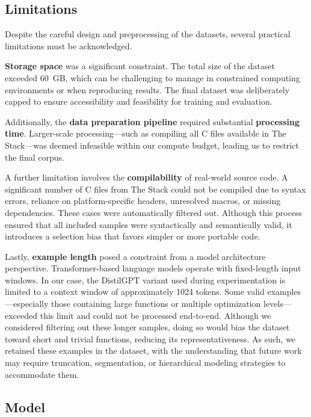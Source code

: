 \documentclass[../main.tex]{subfiles}
\begin{document}
\subsection{Limitations}

Despite the careful design and preprocessing of the datasets, several practical limitations must be acknowledged.

\textbf{Storage space} was a significant constraint. The total size of the dataset exceeded 60~GB, which can be challenging to manage in constrained computing environments or when reproducing results. The final dataset was deliberately capped to ensure accessibility and feasibility for training and evaluation.

Additionally, the \textbf{data preparation pipeline} required substantial \textbf{processing time}. Larger-scale processing---such as compiling all C files available in The Stack---was deemed infeasible within our compute budget, leading us to restrict the final corpus.

A further limitation involves the \textbf{compilability} of real-world source code. A significant number of C files from The Stack could not be compiled due to syntax errors, reliance on platform-specific headers, unresolved macros, or missing dependencies. These cases were automatically filtered out. Although this process ensured that all included samples were syntactically and semantically valid, it introduces a selection bias that favors simpler or more portable code.

Lastly, \textbf{example length} posed a constraint from a model architecture perspective. Transformer-based language models operate with fixed-length input windows. In our case, the DistilGPT variant used during experimentation is limited to a context window of approximately 1024 tokens. Some valid examples---especially those containing large functions or multiple optimization levels---exceeded this limit and could not be processed end-to-end. Although we considered filtering out these longer samples, doing so would bias the dataset toward short and trivial functions, reducing its representativeness. As such, we retained these examples in the dataset, with the understanding that future work may require truncation, segmentation, or hierarchical modeling strategies to accommodate them.

\subsection{Model}
\end{document}
